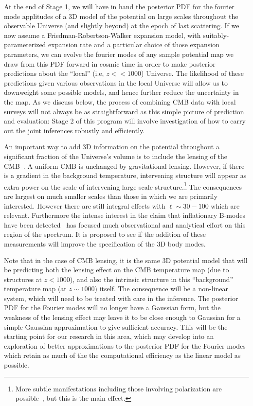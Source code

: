 \documentclass[psfig,12pt]{article}
\def\ni{\noindent}
\begin{document}
{At the end of Stage 1, we will have in hand the posterior PDF for the
fourier mode applitudes of a 3D model of the potential on large scales
throughout the observable Universe (and slightly beyond) at the epoch of
last scattering. If we now assume a  Friedman-Robertson-Walker expansion
model, with suitably-parameterized expansion rate and a particular
choice of those expansion parameters,  we can evolve the fourier modes
of any sample potential map we draw  from this PDF forward in cosmic
time in order to make posterior  predictions about the ``local'' (i.e,
$z << 1000$) Universe. The likelihood of these predictions given various
observations in the local Universe will allow us to downweight some
possible models, and hence further reduce the uncertainty in the map.
As we discuss below, the process of combining CMB data with local surveys
will not always be as straightforward as this simple picture of
prediction and evaluation: Stage 2 of this program will involve
investigation of how to carry out the joint inferences robustly and
efficiently.

\ni{\bf CMB Lensing and ISW Measurements:}
An important way to add 3D information on the potential throughout a
significant fraction of the Universe's volume is to include the lensing
of the CMB~\cite{Planck2015cosmopara}. A uniform CMB is unchanged by
gravitational lensing. However, if there is a gradient in the background
temperature, intervening structure will appear as extra power on the
scale of intervening large scale structure.\footnote{More subtle
manifestations including those involving polarization are
possible~\cite{Hu:2002}, but this is the main effect.} The consequences
are largest on much smaller scales than those in which we are primarily
interested. However there are still integral effects with
$\ell\sim30-100$ which are relevant. Furthermore the intense interest in
the claim that inflationary B-modes have been
detected~\cite{Planck2015cosmopara}  has focused much observational and
analytical effort on this region of the spectrum. It is proposed to see
if the addition of these measurements will improve the specification of
the 3D body modes.

Note that in the case of CMB lensing, it is the same 3D potential model
that will be predicting both the lensing effect on the CMB temperature
map (due to structures at $z < 1000$), and  also the intrinsic structure
in this ``background'' temperature map (at $z \sim 1000$) itself. The
consequence will be a non-linear system, which will need to be treated
with care in the inference. The posterior PDF for the Fourier modes will
no longer have a Gaussian form, but the weakness of the lensing effect
may leave it to be close enough to Gaussian for a simple Gaussian
approximation to give sufficient accuracy. This will be the starting
point for our research in this area, which may develop into an
exploration  of better approximations to the posterior PDF for the
Fourier modes  which retain as much of the the computational efficiency
as the linear model as possible.

}
\end{document}
